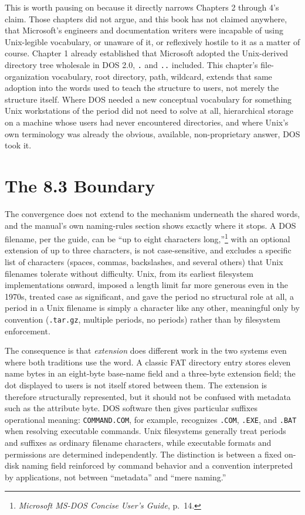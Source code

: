 \documentclass[11pt]{book}
\begin{document}
This is worth pausing on because it directly narrows Chapters 2 through 4's claim. Those chapters did not argue, and this book has not claimed anywhere, that Microsoft's engineers and documentation writers were incapable of using Unix-legible vocabulary, or unaware of it, or reflexively hostile to it as a matter of course. Chapter 1 already established that Microsoft adopted the Unix-derived directory tree wholesale in DOS 2.0, \texttt{.} and \texttt{..} included. This chapter's file-organization vocabulary, root directory, path, wildcard, extends that same adoption into the words used to teach the structure to users, not merely the structure itself. Where DOS needed a new conceptual vocabulary for something Unix workstations of the period did not need to solve at all, hierarchical storage on a machine whose users had never encountered directories, and where Unix's own terminology was already the obvious, available, non-proprietary answer, DOS took it.

\section{The 8.3 Boundary}

The convergence does not extend to the mechanism underneath the shared words, and the manual's own naming-rules section shows exactly where it stops. A DOS filename, per the guide, can be \enquote{up to eight characters long,}\footnote{\emph{Microsoft MS-DOS Concise User's Guide}, p.\ 14.} with an optional extension of up to three characters, is not case-sensitive, and excludes a specific list of characters (spaces, commas, backslashes, and several others) that Unix filenames tolerate without difficulty. Unix, from its earliest filesystem implementations onward, imposed a length limit far more generous even in the 1970s, treated case as significant, and gave the period no structural role at all, a period in a Unix filename is simply a character like any other, meaningful only by convention (\texttt{.tar.gz}, multiple periods, no periods) rather than by filesystem enforcement.

The consequence is that \emph{extension} does different work in the two systems even where both traditions use the word. A classic FAT directory entry stores eleven name bytes in an eight-byte base-name field and a three-byte extension field; the dot displayed to users is not itself stored between them. The extension is therefore structurally represented, but it should not be confused with metadata such as the attribute byte. DOS software then gives particular suffixes operational meaning: \texttt{COMMAND.COM}, for example, recognizes \texttt{.COM}, \texttt{.EXE}, and \texttt{.BAT} when resolving executable commands. Unix filesystems generally treat periods and suffixes as ordinary filename characters, while executable formats and permissions are determined independently. The distinction is between a fixed on-disk naming field reinforced by command behavior and a convention interpreted by applications, not between ``metadata'' and ``mere naming.''
\end{document}
